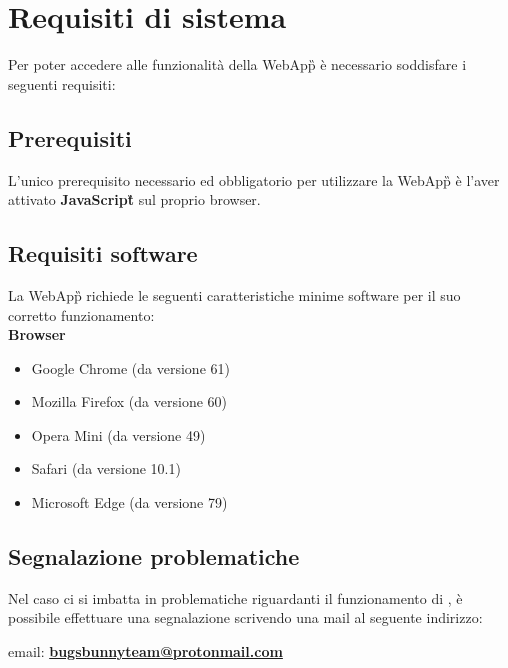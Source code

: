 \section{Requisiti di sistema}
Per poter accedere alle funzionalità della WebApp\G{} è necessario soddisfare i seguenti requisiti:

\subsection{Prerequisiti}
L'unico prerequisito necessario ed obbligatorio per utilizzare la WebApp\G{} \platform{} è l'aver attivato \textbf{JavaScript}\G{} sul proprio browser.

\subsection{Requisiti software}
La WebApp\G{} \platform{} richiede le seguenti caratteristiche minime software per il suo corretto funzionamento:\\


\textbf{Browser}
\begin{itemize}
    \item Google Chrome (da versione 61)
    \item Mozilla Firefox (da versione 60)
    \item Opera Mini (da versione 49)
    \item Safari (da versione 10.1)
    \item Microsoft Edge (da versione 79)
\end{itemize}

\subsection{Segnalazione problematiche}
Nel caso ci si imbatta in problematiche riguardanti il funzionamento di \platform, è possibile
effettuare una segnalazione scrivendo una mail al seguente indirizzo:\\


\begin{center}
email: \textbf{\href{mailto:bugsbunnyteam@protonmail.com}{bugsbunnyteam@protonmail.com} }
\end{center}
